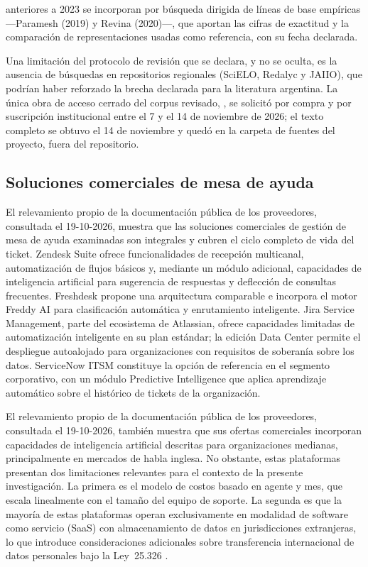 anteriores a 2023 se incorporan por búsqueda dirigida de líneas de base empíricas ---Paramesh (2019) y Revina (2020)---, que aportan las cifras de exactitud y la comparación de representaciones usadas como referencia, con su fecha declarada.

Una limitación del protocolo de revisión que se declara, y no se oculta, es la ausencia de búsquedas en repositorios regionales (SciELO, Redalyc y JAIIO), que podrían haber reforzado la brecha declarada para la literatura argentina. La única obra de acceso cerrado del corpus revisado, \textcite{paket2024itservice}, se solicitó por compra y por suscripción institucional entre el 7 y el 14 de noviembre de 2026; el texto completo se obtuvo el 14 de noviembre y quedó en la carpeta de fuentes del proyecto, fuera del repositorio.

\subsection{Soluciones comerciales de mesa de ayuda}\label{subsec:soluciones-comerciales}

El relevamiento propio de la documentación pública de los proveedores, consultada el 19-10-2026, muestra que las soluciones comerciales de gestión de mesa de ayuda examinadas son integrales y cubren el ciclo completo de vida del ticket. Zendesk Suite ofrece funcionalidades de recepción multicanal, automatización de flujos básicos y, mediante un módulo adicional, capacidades de inteligencia artificial para sugerencia de respuestas y deflección de consultas frecuentes. Freshdesk propone una arquitectura comparable e incorpora el motor Freddy AI para clasificación automática y enrutamiento inteligente. Jira Service Management, parte del ecosistema de Atlassian, ofrece capacidades limitadas de automatización inteligente en su plan estándar; la edición Data Center permite el despliegue autoalojado para organizaciones con requisitos de soberanía sobre los datos. ServiceNow ITSM constituye la opción de referencia en el segmento corporativo, con un módulo Predictive Intelligence que aplica aprendizaje automático sobre el histórico de tickets de la organización.

El relevamiento propio de la documentación pública de los proveedores, consultada el 19-10-2026, también muestra que sus ofertas comerciales incorporan capacidades de inteligencia artificial descritas para organizaciones medianas, principalmente en mercados de habla inglesa. No obstante, estas plataformas presentan dos limitaciones relevantes para el contexto de la presente investigación. La primera es el modelo de costos basado en agente y mes, que escala linealmente con el tamaño del equipo de soporte. La segunda es que la mayoría de estas plataformas operan exclusivamente en modalidad de software como servicio (SaaS) con almacenamiento de datos en jurisdicciones extranjeras, lo que introduce consideraciones adicionales sobre transferencia internacional de datos personales bajo la Ley~25.326 \parencite{Ley25326_2000}.

